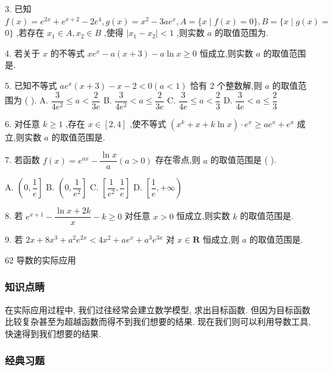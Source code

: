 3. 已知 $f\left( x\right)  = {{e}}^{2x} + {{e}}^{x + 2} - 2{{e}}^{4},g\left( x\right)  = {x}^{2} - {3a}{{e}}^{x},A = \{ x \mid  f\left( x\right)  = 0\} ,B = \{ x \mid  g\left( x\right)  =$  $0\}$ ,若存在 ${x}_{1} \in  A,{x}_{2} \in  B$ ,使得 $\left| {{x}_{1} - {x}_{2}}\right|  < 1$ ,则实数 $a$ 的取值范围为\blkda{}.

4. 若关于 $x$ 的不等式 $x{{e}}^{x} - a\left( {x + 3}\right)  - a\ln x \geq  0$ 恒成立,则实数 $a$ 的取值范围是\blkda{}.

5. 已知不等式 $a{{e}}^{x}\left( {x + 3}\right)  - x - 2 < 0\left( {a < 1}\right)$ 恰有 2 个整数解,则 $a$ 的取值范围为 (   ). A. $\dfrac{3}{4{{e}}^{2}} \leq  a < \dfrac{2}{3{e}}$ B. $\dfrac{3}{4{{e}}^{2}} < a \leq  \dfrac{2}{3{e}}$ C. $\dfrac{3}{4{e}} \leq  a < \dfrac{2}{3}$ D. $\dfrac{3}{4{e}} < a \leq  \dfrac{2}{3}$

6. 对任意 $k \geq  1$ ,存在 $x \in  \left\lbrack  {2,4}\right\rbrack$ ,使不等式 $\left( {{x}^{k} + x + k\ln x}\right)  \cdot  {{e}}^{x} \geq  a{{e}}^{x} + {{e}}^{a}$ 成立,则实数 $a$ 的取值范围是\blkda{}.

7. 若函数 $f\left( x\right)  = {{e}}^{ax} - \dfrac{\ln x}{a}\left( {a > 0}\right)$ 存在零点,则 $a$ 的取值范围是 (   ).

A. $\left( {0,\dfrac{1}{{e}}}\right\rbrack$ B. $\left( {0,\dfrac{1}{{{e}}^{2}}}\right\rbrack$ C. $\left\lbrack  {\dfrac{1}{{{e}}^{2}},\dfrac{1}{{e}}}\right\rbrack$ D. $\left\lbrack  {\dfrac{1}{{e}}, + \infty }\right)$

8. 若 ${{e}}^{x + 1} - \dfrac{\ln x + {2k}}{x} - k \geq  0$ 对任意 $x > 0$ 恒成立,则实数 $k$ 的取值范围是\blkda{}.

9. 若 ${2x} + 8{x}^{3} + {a}^{2}{{e}}^{2x} < 4{x}^{2} + a{{e}}^{x} + {a}^{3}{{e}}^{3x}$ 对 $x \in  \mathbf{R}$ 恒成立,则 $a$ 的取值范围是\blkda{}.

62 导数的实际应用

\subsubsection*{知识点睛}

在实际应用过程中, 我们过往经常会建立数学模型, 求出目标函数. 但因为目标函数比较复杂甚至为超越函数而得不到我们想要的结果. 现在我们则可以利用导数工具, 快速得到我们想要的结果.

\subsubsection*{经典习题}

